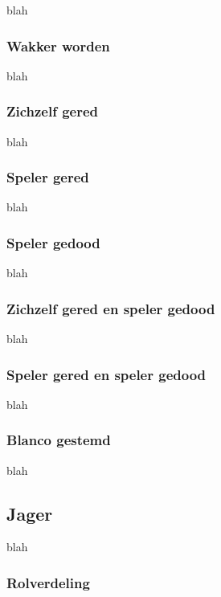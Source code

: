 \documentclass[12pt]{article}
\begin{document}
      blah
    
    \subsubsection{Wakker worden}
    
      blah
    
    \subsubsection{Zichzelf gered}
    
      blah
    
    \subsubsection{Speler gered}
    
      blah
    
    \subsubsection{Speler gedood}
    
      blah
    
    \subsubsection{Zichzelf gered en speler gedood}
    
      blah
    
    \subsubsection{Speler gered en speler gedood}
    
      blah
    
    \subsubsection{Blanco gestemd}
    
      blah
  
  \subsection{Jager}
    
      blah
  
    \subsubsection{Rolverdeling}
    
\end{document}
